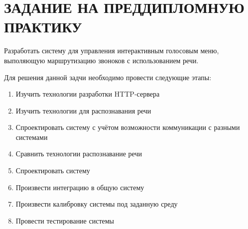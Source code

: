 \chapter{ЗАДАНИЕ НА ПРЕДДИПЛОМНУЮ ПРАКТИКУ}

Разработать систему для управления интерактивным голосовым меню,
выполяющую маршрутизацию звоноков с использованием речи.

Для решения данной задчи необходимо провести следующие этапы:
\begin{enumerate}
    \item Изучить технологии разработки HTTP-сервера
    \item Изучить технологии для распознавания речи
    \item Спроектировать систему с учётом возможности коммуникации с разными системами
    \item Сравнить технологии распознавание речи
    \item Спроектировать систему
    \item Произвести интеграцию в общую систему
    \item Произвести калибровку системы под заданную среду
    \item Провести тестирование системы
\end{enumerate}
